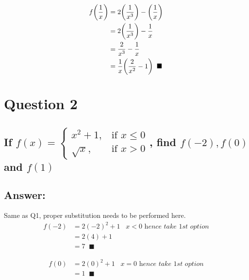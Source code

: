 \documentclass[17 pt]{extarticle}
\begin{document}
\begin{equation*}
    \begin{split}
        f \biggl \lparen \frac{1}{x} \biggr \rparen &= 2\biggl \lparen \frac{1}{x^3} \biggr \rparen - \biggl \lparen \frac{1}{x} \biggr \rparen \\
        & = 2 \biggl \lparen \frac{1}{x^3} \biggr \rparen - \frac{1}{x} \\
        &= \frac{2}{x^3} - \frac{1}{x} \\
        &= \frac{1}{x} \biggl \lparen \frac{2}{x^2} - 1 \biggr \rparen \; \; \blacksquare
    \end{split}
\end{equation*}

\newpage
\section{Question 2}

\subsection*{If $f(x) = \begin{cases} x^2+1, & \text{if } x \leq 0 \\
\sqrt x, & \text{if } x > 0 \end{cases}$, find $f(-2), f(0)$ and $f(1)$}

\vspace{10mm}

\subsection*{Answer:}

Same as Q1, proper substitution needs to be performed here. 
\begin{equation*}
    \begin{split}
        f(-2) &= 2(-2)^2 + 1 \; \; \; \textit{$x <  0$ hence take 1st option} \\
        & = 2(4) + 1 \\
        &= 7 \; \; \blacksquare
    \end{split}
    \end{equation*}

    \begin{equation*}
        \begin{split}
            f(0) &= 2(0)^2 + 1 \; \; \; \textit{$x = 0$ hence take 1st option} \\
            &= 1 \; \; \blacksquare
        \end{split}
        \end{equation*}
\end{document}
